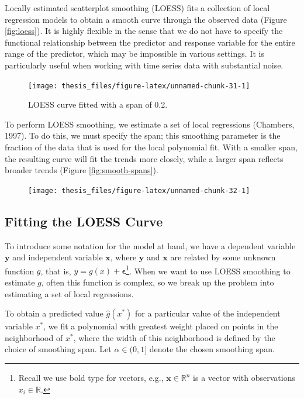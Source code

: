 \documentclass[12pt,twoside]{smiththesis}
\begin{document}
Locally estimated scatterplot smoothing (LOESS) fits a collection of local regression models to obtain a smooth curve through the observed data (Figure \ref{fig:loess}). It is highly flexible in the sense that we do not have to specify the functional relationship between the predictor and response variable for the entire range of the predictor, which may be impossible in various settings. It is particularly useful when working with time series data with substantial noise.
\begin{figure}

{\centering \texttt{[image: thesis\_files/figure-latex/unnamed-chunk-31-1]} 

}

\caption{\label{fig:loess}LOESS curve fitted with  a span of 0.2. }\label{fig:unnamed-chunk-31}
\end{figure}
To perform LOESS smoothing, we estimate a set of local regressions (Chambers, 1997). To do this, we must specify the span; this smoothing parameter is the fraction of the data that is used for the local polynomial fit. With a smaller span, the resulting curve will fit the trends more closely, while a larger span reflects broader trends (Figure \ref{fig:smooth-spans}).
\begin{figure}

{\centering \texttt{[image: thesis\_files/figure-latex/unnamed-chunk-32-1]} 

}

\caption{\label{fig:smooth-spans}}\label{fig:unnamed-chunk-32}
\end{figure}
\hypertarget{fitting-the-loess-curve}{%
\subsection{Fitting the LOESS Curve}\label{fitting-the-loess-curve}}

To introduce some notation for the model at hand, we have a dependent variable \(\mathbf y\) and independent variable \(\mathbf x\), where \(\mathbf y\) and \(\mathbf x\) are related by some unknown function \(g\), that is, \(y = g(x) + \boldsymbol \epsilon\)\footnote{Recall we use bold type for vectors, e.g., \(\mathbf x \in \mathbb R^n\) is a vector with observations \(x_i \in \mathbb R\).}. When we want to use LOESS smoothing to estimate \(g\), often this function is complex, so we break up the problem into estimating a set of local regressions.

To obtain a predicted value \(\hat g(x^*)\) for a particular value of the independent variable \(x^*\), we fit a polynomial with greatest weight placed on points in the neighborhood of \(x^*\), where the width of this neighborhood is defined by the choice of smoothing span. Let \(\alpha \in (0,1]\) denote the chosen smoothing span.
\end{document}
